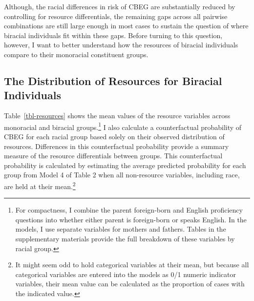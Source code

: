 \documentclass[
  12pt,
  letterpaper,
]{article}
\begin{document}
Although, the racial differences in risk of CBEG are substantially
reduced by controlling for resource differentials, the remaining gaps
across all pairwise combinations are still large enough in most cases to
sustain the question of where biracial individuals fit within these
gaps. Before turning to this question, however, I want to better
understand how the resources of biracial individuals compare to their
monoracial constituent groups.

\hypertarget{the-distribution-of-resources-for-biracial-individuals}{%
\subsection{The Distribution of Resources for Biracial
Individuals}\label{the-distribution-of-resources-for-biracial-individuals}}

Table~\ref{tbl-resources} shows the mean values of the resource
variables across monoracial and biracial groups.\footnote{For
  compactness, I combine the parent foreign-born and English proficiency
  questions into whether either parent is foreign-born or speaks
  English. In the models, I use separate variables for mothers and
  fathers. Tables in the supplementary materials provide the full
  breakdown of these variables by racial group.} I also calculate a
counterfactual probability of CBEG for each racial group based solely on
their observed distribution of resources. Differences in this
counterfactual probability provide a summary measure of the resource
differentials between groups. This counterfactual probability is
calculated by estimating the average predicted probability for each
group from Model 4 of Table 2 when all non-resource variables, including
race, are held at their mean.\footnote{It might seem odd to hold
  categorical variables at their mean, but because all categorical
  variables are entered into the models as 0/1 numeric indicator
  variables, their mean value can be calculated as the proportion of
  cases with the indicated value.}
\end{document}

